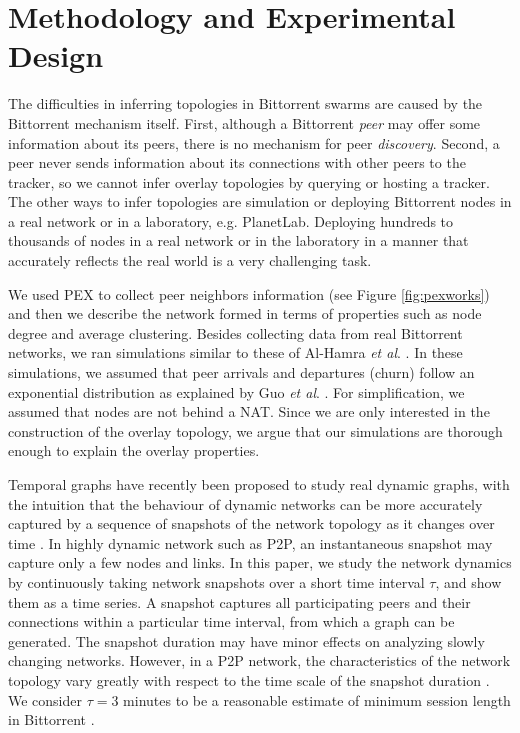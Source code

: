 \documentclass[paper]{ieice}
\begin{document}
\section{Methodology and Experimental Design}\label{methodanddesign}
The difficulties in inferring topologies in Bittorrent swarms are caused by the Bittorrent mechanism itself. 
First, although a Bittorrent \textit{peer} may offer some information about its peers, there is no mechanism for peer \textit{discovery}.  
Second, a peer never sends information about its connections with other peers to the tracker, so we cannot infer overlay topologies by querying or hosting a tracker.  
The other ways to infer topologies are simulation or deploying Bittorrent nodes in a real network or in a laboratory, e.g. PlanetLab. Deploying hundreds to thousands of nodes in a real network or in the laboratory in a manner that accurately reflects the real world is a very challenging task.

We used PEX to collect peer neighbors information  (see Figure \ref{fig:pexworks}) and then we describe the network formed in terms of properties such as node degree and average clustering. 
Besides collecting data from real Bittorrent networks, we ran simulations similar to these of Al-Hamra \textit{et al}. \cite{al2009swarming}. 
In these simulations, we assumed that peer arrivals and departures (churn) follow an exponential distribution as explained by Guo \textit{et al}. \cite{guo2005measurements}. 
For simplification, we assumed that nodes are not behind a NAT.
Since we are only interested in the construction of the overlay topology, we argue that our simulations are thorough enough to explain the overlay properties.

Temporal graphs have recently been proposed to study real dynamic graphs, with the intuition that the behaviour of dynamic networks can be more accurately captured by a sequence of snapshots of the network topology as it changes over time \cite{}.
In highly dynamic network such as P2P, an instantaneous snapshot may capture only a few nodes and links. 
In this paper, we study the network dynamics by continuously taking network snapshots over a short time interval $\tau$, and show them as a time series.
A snapshot captures all participating peers and their connections within a particular time interval, from which a graph can be generated.
The snapshot duration may have minor effects on analyzing slowly changing networks.
However, in a P2P network, the characteristics of the network topology vary greatly with respect to the time scale of the snapshot duration \cite{stutzbach2008characterizing}.
We consider $\tau=3 $ minutes to be a reasonable estimate of minimum session length in Bittorrent \cite{stutzbach2006understanding}. 
\end{document}

